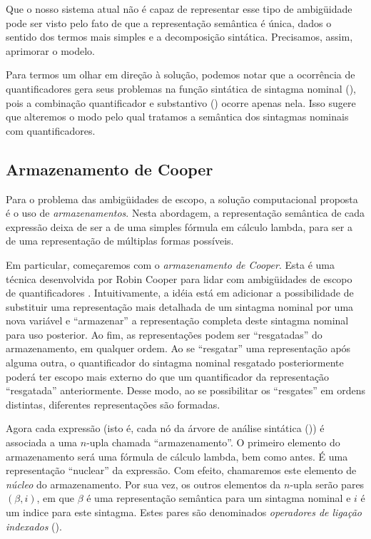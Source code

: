 Que o nosso sistema atual não é capaz de representar esse tipo de ambigüidade pode ser visto pelo fato de que a representação semântica é única, dados o sentido dos termos mais simples e a decomposição sintática. Precisamos, assim, aprimorar o modelo.

Para termos um olhar em direção à solução, podemos notar que a ocorrência de quantificadores gera seus problemas na função sintática de sintagma nominal (), pois a combinação quantificador e substantivo () ocorre apenas nela. Isso sugere que alteremos o modo pelo qual tratamos a semântica dos sintagmas nominais com quantificadores.

\subsection{Armazenamento de Cooper}

Para o problema das ambigüidades de escopo, a solução computacional proposta é o uso de \textit{armazenamentos}. Nesta abordagem, a representação semântica de cada expressão deixa de ser a de uma simples fórmula em cálculo lambda, para ser a de uma representação de múltiplas formas possíveis.

Em particular, começaremos com o \textit{armazenamento de Cooper}. Esta é uma técnica desenvolvida por Robin Cooper para lidar com ambigüidades de escopo de quantificadores \cite[p.~113]{BlackburnBos:2005}. Intuitivamente, a idéia está em adicionar a possibilidade de substituir uma representação mais detalhada de um sintagma nominal por uma nova variável e ``armazenar'' a representação completa deste sintagma nominal para uso posterior. Ao fim, as representações podem ser ``resgatadas'' do armazenamento, em qualquer ordem. Ao se ``resgatar'' uma representação após alguma outra, o quantificador do sintagma nominal resgatado posteriormente poderá ter escopo mais externo do que um quantificador da representação ``resgatada'' anteriormente. Desse modo, ao se possibilitar os ``resgates'' em ordens distintas, diferentes representações são formadas.

Agora cada expressão (isto é, cada nó da árvore de análise sintática ()) é associada a uma $n$-upla chamada ``armazenamento''. O primeiro elemento do armazenamento será uma fórmula de cálculo lambda, bem como antes. É uma representação ``nuclear'' da expressão. Com efeito, chamaremos este elemento de \textit{núcleo} do armazenamento. Por sua vez, os outros elementos da $n$-upla serão pares $(\beta, i)$, em que $\beta$ é uma representação semântica para um sintagma nominal e $i$ é um indice para este sintagma. Estes pares são denominados \textit{operadores de ligação indexados} ().

